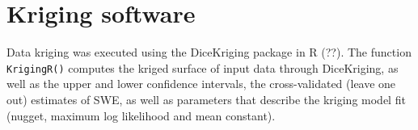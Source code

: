 \documentclass[12pt]{article}
\begin{document}
\section{Kriging software}
\label{sec:KrigingMethods}
Data kriging was executed using the DiceKriging package in R (??). The function \texttt{KrigingR()} computes the kriged surface of input data through DiceKriging, as well as the upper and lower confidence intervals, the cross-validated (leave one out) estimates of SWE, as well as parameters that describe the kriging model fit (nugget, maximum log likelihood and mean constant). 
\end{document}
